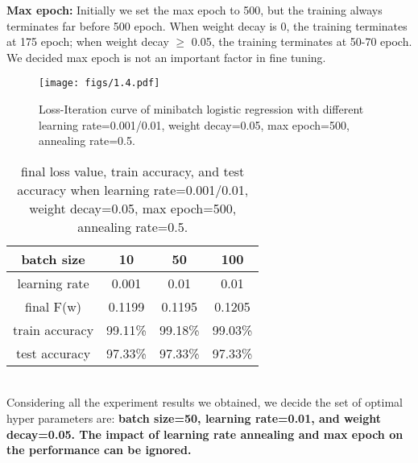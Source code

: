 \documentclass{article}
\begin{document}
        \textbf{Max epoch:} Initially we set the max epoch to 500, but the training always terminates far before 500 epoch.
        When weight decay is 0, the training terminates at 175 epoch; when weight decay $\geq$ 0.05, the training terminates at 50-70 epoch.
        We decided max epoch is not an important factor in fine tuning.\\
        \vspace{-20pt}
        \begin{figure}[hbt!]
            \centering
            \texttt{[image: figs/1.4.pdf]}
            \caption{Loss-Iteration curve of minibatch logistic regression with different learning rate=0.001/0.01,
            weight decay=0.05, max epoch=500, annealing rate=0.5.}
            \label{fig:1.4}
        \end{figure}
        \begin{table}[hbt!]
            \centering
            \begin{tabular}{|c||c|c|c|}
                \hline
                batch size&10&50&100\\
                \hline
                learning rate&0.001&0.01&0.01\\
                \hline
                final F(w)&0.1199&0.1195&0.1205\\
                \hline
                train accuracy&99.11\%&99.18\%&99.03\%\\
                \hline
                test accuracy&97.33\%&97.33\%&97.33\%\\
                \hline
            \end{tabular}
            \caption{final loss value, train accuracy, and test accuracy when learning rate=0.001/0.01,
            weight decay=0.05, max epoch=500, annealing rate=0.5.}
        \end{table}\\
        Considering all the experiment results we obtained, we decide the set of optimal hyper parameters are:
        \textbf{batch size=50, learning rate=0.01, and weight decay=0.05. The impact of learning rate annealing and max epoch on the performance can be ignored.}
\end{document}
